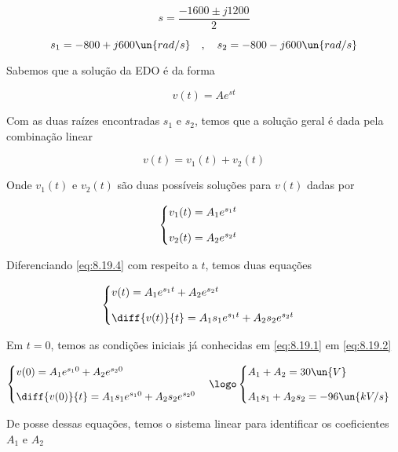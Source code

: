 \[ s = \frac{-1600 \pm j1200}{2} \]

\[ s_1 = -800 + j600 \un{rad/s} \quad , \quad s_2 = -800 - j600 \un{rad/s} \]

Sabemos que a solução da EDO é da forma

\[ v(t) = Ae^{st}  \]

Com as duas raízes encontradas $s_1$ e $s_2$, temos que a solução geral é dada pela combinação linear

\begin{equation}\label{eq:8.19.4}
    v(t) = v_1(t) + v_2(t)
\end{equation}

Onde $v_1(t)$ e $v_2(t)$ são duas possíveis soluções para $v(t)$ dadas por  

\[ \begin{cases}
        v_1(t) = A_1e^{s_1t}  & \\
        \noalign{\vskip9pt}
        v_2(t) = A_2e^{s_2t}
    \end{cases}
\]

Diferenciando \eqref{eq:8.19.4} com respeito a $t$, temos duas equações

\[ \begin{cases}
        v(t) = A_1e^{s_1t} + A_2e^{s_2t} & \\
        \noalign{\vskip9pt}
        \diff{v(t)}{t} = A_1s_1e^{s_1t} + A_2s_2e^{s_2t}
    \end{cases}
\]

Em $t=0$, temos as condições iniciais já conhecidas em \eqref{eq:8.19.1} em \eqref{eq:8.19.2}

\[ \begin{cases}
        v(0) = A_1e^{s_10} + A_2e^{s_20} & \\
        \noalign{\vskip9pt}
        \diff{v(0)}{t} = A_1s_1e^{s_10} + A_2s_2e^{s_20}
    \end{cases}
    \logo
    \begin{cases}
        A_1 + A_2 = 30 \un{V} & \\
        \noalign{\vskip9pt}
        A_1s_1 + A_2s_2 = -96 \un{kV/s}
    \end{cases}
\]

De posse dessas equações, temos o sistema linear para identificar os coeficientes $A_1$ e $A_2$

\begingroup
\renewcommand*{\arraystretch}{4}

